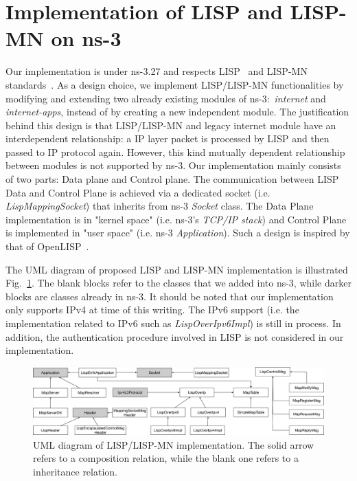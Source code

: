 \section{Implementation of LISP and LISP-MN on ns-3}
\label{sec:ns3_lispmn}
Our implementation is under ns-3.27 and respects LISP~\cite{rfc6830} and LISP-MN standards~\cite{meyer2016lisp}. As a design choice, we implement LISP/LISP-MN functionalities by modifying and extending two already existing modules of ns-3:~\emph{internet} and \emph{internet-apps}, instead of by creating a new independent module. The justification behind this design is that LISP/LISP-MN and legacy internet module have an interdependent relationship: a IP layer packet is processed by LISP and then passed to IP protocol again. However, this kind mutually dependent relationship between modules is not supported by ns-3. Our implementation mainly consists of two parts: Data plane and Control plane. The communication between LISP Data and Control Plane is achieved via a dedicated socket (i.e. \emph{LispMappingSocket}) that inherits from ns-3 \emph{Socket} class. The Data Plane implementation is in "kernel space" (i.e. ns-3's \emph{TCP/IP stack}) and Control Plane is implemented in "user space" (i.e. ns-3 \emph{Application}). Such a design is inspired by that of OpenLISP~\cite{saucez2009openlisp}.  

The UML diagram of proposed LISP and LISP-MN implementation is illustrated Fig.~\ref{LISP-UML}. The blank blocks refer to the classes that we added into ns-3, while darker blocks are classes already in ns-3. It should be noted that our implementation only supports IPv4 at time of this writing. The IPv6 support (i.e. the implementation related to IPv6 such as \emph{LispOverIpv6Impl}) is still in process. In addition, the authentication procedure involved in LISP is not considered in our implementation.
\begin{figure}[!t]
	\centering
	\includegraphics[width=\textwidth]{Pics/LISP-NS3-UML}
	\caption{UML diagram of LISP/LISP-MN implementation. The solid arrow refers to a composition relation, while the blank one refers to a inheritance relation.}
	\label{LISP-UML}
\end{figure}
